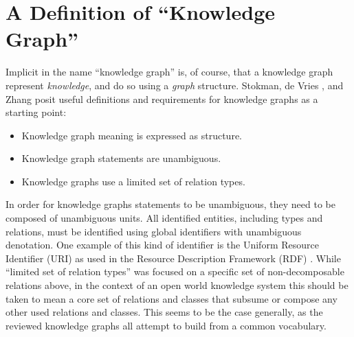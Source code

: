 \section{A Definition of ``Knowledge Graph''}

Implicit in the name ``knowledge graph'' is, of course, that a knowledge graph represent \emph{knowledge}, and do so using a \emph{graph} structure.
Stokman,  de Vries \cite{Stokman_1988}, and Zhang \cite{zhang2002knowledge} posit useful definitions and requirements for knowledge graphs as a starting point:

\begin {itemize}
\item Knowledge graph meaning is expressed as structure.
\item Knowledge graph statements are unambiguous.
\item Knowledge graphs use a limited set of relation types.
\end {itemize}

In order for knowledge graphs statements to be unambiguous, they need to be composed of unambiguous units. All identified entities, including types and relations, must be identified using global identifiers with unambiguous denotation.
One example of this kind of identifier is the Uniform Resource Identifier (URI) as used in the Resource Description Framework (RDF) \cite{cyganiak2014rdf}.
While ``limited set of relation types'' was focused on a specific set of non-decomposable relations above, in the context of an open world knowledge system this should be taken to mean a core set of relations and classes that subsume or compose any other used relations and classes.
This seems to be the case generally, as the reviewed knowledge graphs all attempt to build from a common vocabulary.

